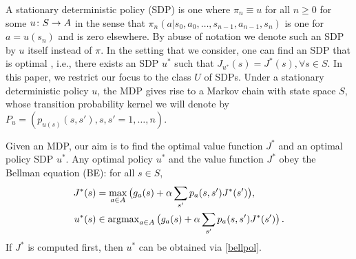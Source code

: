 A stationary deterministic policy (SDP) is one where $\pi_n\equiv u$ for all $n\geq 0$ for some $u\colon S \rightarrow A$
in the sense that $\pi_n(a|s_0,a_0,\dots,s_{n-1},a_{n-1},s_n)$ is one for $a = u(s_n)$ and is zero elsewhere.
By abuse of notation we denote such an SDP by $u$ itself instead of $\pi$. 
In the setting that we consider, one can find an SDP that is optimal \cite{BertB,Puter}, i.e., there exists an SDP $u^*$ such that $J_{u^*}(s)=J^*(s),\forall s\in S$. 
In this paper, we restrict our focus to the class $U$ of SDPs. 
Under a stationary deterministic policy $u$, 
	the MDP gives rise to a Markov chain with state space $S$,
whose  transition probability kernel we will denote
	by $P_u=(p_{u(s)}(s,s'),s,s'=1,\ldots,n)$.  
	
Given an MDP, our aim is to find the optimal value function $J^*$ and an optimal policy SDP $u^*$. 
Any optimal policy $u^*$ and the value function $J^*$ obey the Bellman equation (BE): for all $ s \in S$, 
\begin{subequations}\label{bell}
\begin{align}
\label{bellval}J^*(s)&=\max_{ a\in A}\big(g_a(s)+\alpha \sum_{s'}p_a(s,s')J^*(s')\big),\\
\label{bellpol}u^*(s)&\in \argmax_{ a\in A}\big(g_a(s)+\alpha \sum_{s'}p_a(s,s')J^*(s')\big)\,.
\end{align}
\end{subequations}
If $J^*$ is computed first, then $u^*$ can be obtained via \eqref{bellpol}. 

